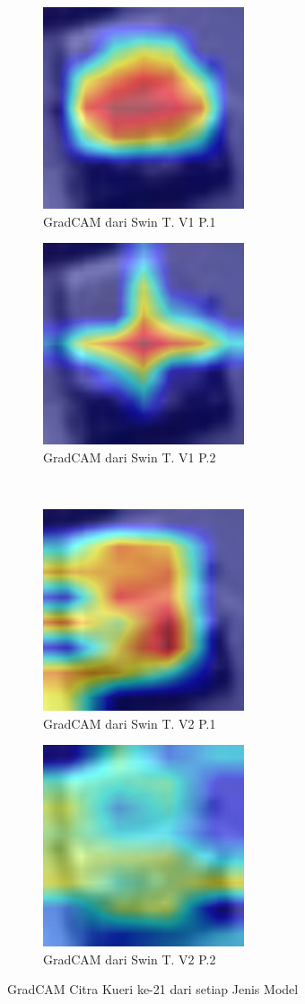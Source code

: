 \begin{figure}[h!]
  \centering
  \begin{subfigure}{.4\textwidth}
    \centering
    \includegraphics[width=.3\linewidth]{gambar/Que21_GradCAMV1P1IT3.jpg}
    \caption{GradCAM dari Swin T. V1 P.1}
    \label{gradcamkuerinomorduasatuV1P1}
  \end{subfigure}%
  \begin{subfigure}{.4\textwidth}
    \centering
    \includegraphics[width=.3\linewidth]{gambar/Que21_gradCAMV1P2IT2.jpg}
    \caption{GradCAM dari Swin T. V1 P.2}
    \label{gradcamkuerinomorduasatuV1P2}
  \end{subfigure}%
  \\
  \begin{subfigure}{.4\textwidth}
    \centering
    \includegraphics[width=.3\linewidth]{gambar/Que21_V2P1IT1.png}
    \caption{GradCAM dari Swin T. V2 P.1}
    \label{gradcamkuerinomorduasatuV2P1}
  \end{subfigure}%
  \begin{subfigure}{.4\textwidth}
    \centering
    \includegraphics[width=.3\linewidth]{gambar/Que21_V2P2IT3.png}
    \caption{GradCAM dari Swin T. V2 P.2}
    \label{gradcamkuerinomorduasatuV2P2}
  \end{subfigure}%
  \caption{GradCAM Citra Kueri ke-21 dari setiap Jenis Model}
  \label{fig:gradcamdarisetiapjenismodelpengujiankeempat}
\end{figure}

